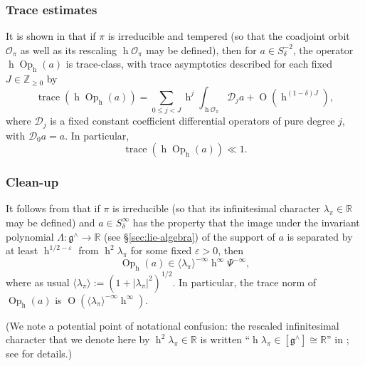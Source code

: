 \documentclass[reqno,10pt]{amsart}
\theoremstyle{plain} %
\theoremstyle{definition}
\theoremstyle{plain} %
\theoremstyle{remark}
\theoremstyle{itplain} %
\theoremstyle{remark} %
\renewcommand{\geq}{\geqslant}
\renewcommand{\leq}{\leqslant}
\numberwithin{equation}{section}
\def\eps{\varepsilon}
\DeclareMathOperator{\trace}{trace}
\def\O{\operatorname{O}}
\DeclareMathOperator{\Opp}{Op}
\DeclareMathOperator{\h}{h}
\begin{document}
\subsubsection{Trace estimates}\label{sec:opp-trace-estimates}
It is shown in \cite[\S12.3]{nelson-venkatesh-1} that if $\pi$ is irreducible and tempered (so that the coadjoint orbit $\mathcal{O}_{\pi}$ as well as its rescaling $\h \mathcal{O}_\pi$ may be defined), then for $a \in S^{-2}_\delta$, the operator $\h \Opp_{\h}(a)$ is trace-class, with trace asymptotics described for each fixed $J \in \mathbb{Z}_{\geq 0}$ by
\begin{equation}\label{eq:kirillov-expanded}
  \trace(\h \Opp_{\h}(a))
  = 
  \sum_{0 \leq j < J}
  \h^j \int_{\h \mathcal{O}_\pi }
  \mathcal{D}_j a
  + \O(\h^{(1-\delta) J}),
\end{equation}
where $\mathcal{D}_j$ is a fixed constant coefficient differential operators of pure degree $j$, with $\mathcal{D}_0 a = a$.  In particular,
\begin{equation}\label{eq:kirillov-expanded-2}
  \trace(\h \Opp_{\h}(a))
  \ll 1.
\end{equation}

\subsubsection{Clean-up}\label{sec:clean-up}
It follows from \cite[\S10.3]{nelson-venkatesh-1} that if $\pi$ is irreducible (so that its infinitesimal character $\lambda_\pi \in \mathbb{R}$ may be defined) and $a \in S^{\infty}_\delta$ has the property that the image under the invariant polynomial $\Lambda : \mathfrak{g}^\wedge \rightarrow \mathbb{R}$ (see \S\ref{sec:lie-algebra}) of the support of $a$ is separated by at least $\h^{1/2-\eps}$ from $\h^2 \lambda_\pi$ for some fixed $\eps > 0$, then
\begin{equation*}
  \Opp_{\h}(a) \in
  \langle \lambda_{\pi} \rangle^{-\infty}
  \h^\infty \Psi^{-\infty},
\end{equation*}
where as usual $\langle \lambda_\pi \rangle := (1 + |\lambda_\pi|^2)^{1/2}$.  In particular, the trace norm of $\Opp_{\h}(a)$ is $\O(\langle \lambda_{\pi} \rangle^{-\infty} \h^\infty)$.

(We note a potential point of notational confusion: the rescaled infinitesimal character that we denote here by $\h^2 \lambda_\pi \in \mathbb{R}$ is written ``$\h \lambda_\pi \in [\mathfrak{g}^\wedge] \cong \mathbb{R}$'' in \cite{nelson-venkatesh-1}; see \cite[\S9]{nelson-venkatesh-1} for details.)
\end{document}
